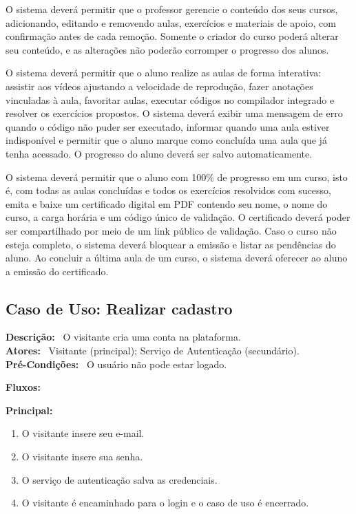 \documentclass[11pt,a4paper]{article}
\newcommand{\casodeuso}[1]{\subsection{Caso de Uso: #1}}
\newcommand{\campo}[1]{\textbf{#1:}~}
\newcommand{\fluxotitulo}[1]{\par\needspace{8\baselineskip}\medskip\hspace*{1.5em}\textbf{#1}\par\nopagebreak}
\newenvironment{principal}
  {\begin{enumerate}[leftmargin=4.5em,itemsep=0pt,topsep=2pt]}
  {\end{enumerate}}
\begin{document}
  O sistema deverá permitir que o professor gerencie o conteúdo dos seus
  cursos, adicionando, editando e removendo aulas, exercícios e materiais de apoio, com
  confirmação antes de cada remoção. Somente o criador do curso poderá alterar
  seu conteúdo, e as alterações não poderão corromper o progresso dos alunos.

  O sistema deverá permitir que o aluno realize as aulas de forma interativa:
  assistir aos vídeos ajustando a velocidade de reprodução, fazer anotações
  vinculadas à aula, favoritar aulas, executar códigos no compilador integrado
  e resolver os exercícios propostos. O sistema deverá exibir uma mensagem de
  erro quando o código não puder ser executado, informar quando uma aula estiver
  indisponível e permitir que o aluno marque como concluída uma aula que já
  tenha acessado. O progresso do aluno deverá ser salvo automaticamente.

  O sistema deverá permitir que o aluno com 100\% de progresso em um curso, isto
  é, com todas as aulas concluídas e todos os exercícios resolvidos com sucesso,
  emita e baixe um certificado digital em PDF contendo seu nome, o nome do
  curso, a carga horária e um código único de validação. O certificado deverá
  poder ser compartilhado por meio de um link público de validação. Caso o curso
  não esteja completo, o sistema deverá bloquear a emissão e listar as
  pendências do aluno. Ao concluir a última aula de um curso, o sistema deverá
  oferecer ao aluno a emissão do certificado.

  \casodeuso{Realizar cadastro}

  \campo{Descrição} O visitante cria uma conta na plataforma.\\
  \campo{Atores} Visitante (principal); Serviço de Autenticação (secundário).\\
  \campo{Pré-Condições} O usuário não pode estar logado.

  \campo{Fluxos}

  \fluxotitulo{Principal:}
  \begin{principal}
    \item O visitante insere seu e-mail.
    \item O visitante insere sua senha.
    \item O serviço de autenticação salva as credenciais.
    \item O visitante é encaminhado para o login e o caso de uso é encerrado.
  \end{principal}
\end{document}
